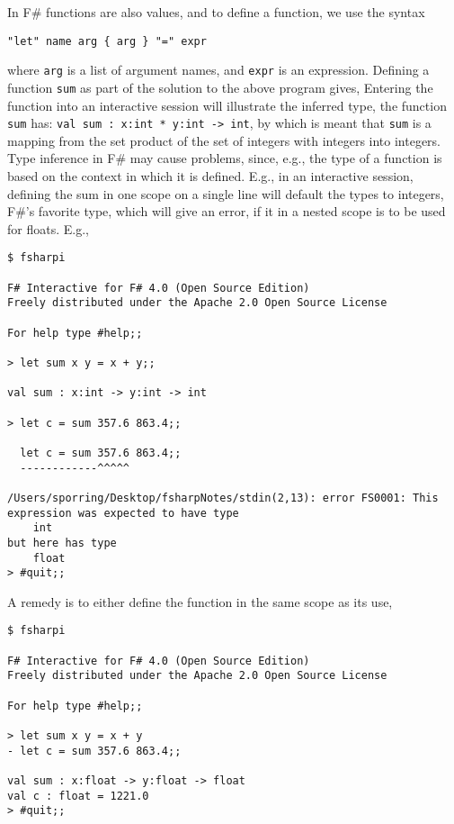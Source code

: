 In F\# functions are also values, and to define a function, we use the syntax
\begin{lstlisting}[language=ebnf]
  "let" name arg { arg } "=" expr
\end{lstlisting}
where \lstinline|arg| is a list of argument names, and \lstinline|expr| is an expression. Defining a function \lstinline|sum| as part of the solution to the above program gives,
Entering the function into an interactive session will illustrate the inferred type, the function \lstinline|sum| has: \lstinline{val sum : x:int * y:int -> int}, by which is meant that \lstinline|sum| is a mapping from the set product of the set of integers with integers into integers. Type inference in F\# may cause problems, since, e.g., the type of a function is based on the context in which it is defined. E.g., in an interactive session, defining the sum in one scope on a single line will default the types to integers, F\#'s favorite type, which will give an error, if it in a nested scope is to be used for floats. E.g.,
\begin{lstlisting}[language=console]
$ fsharpi

F# Interactive for F# 4.0 (Open Source Edition)
Freely distributed under the Apache 2.0 Open Source License

For help type #help;;

> let sum x y = x + y;;

val sum : x:int -> y:int -> int

> let c = sum 357.6 863.4;;

  let c = sum 357.6 863.4;;
  ------------^^^^^

/Users/sporring/Desktop/fsharpNotes/stdin(2,13): error FS0001: This expression was expected to have type
    int    
but here has type
    float    
> #quit;;
\end{lstlisting}
A remedy is to either define the function in the same scope as its use,
\begin{lstlisting}[language=console]
$ fsharpi

F# Interactive for F# 4.0 (Open Source Edition)
Freely distributed under the Apache 2.0 Open Source License

For help type #help;;

> let sum x y = x + y
- let c = sum 357.6 863.4;;

val sum : x:float -> y:float -> float
val c : float = 1221.0
> #quit;;
\end{lstlisting}

